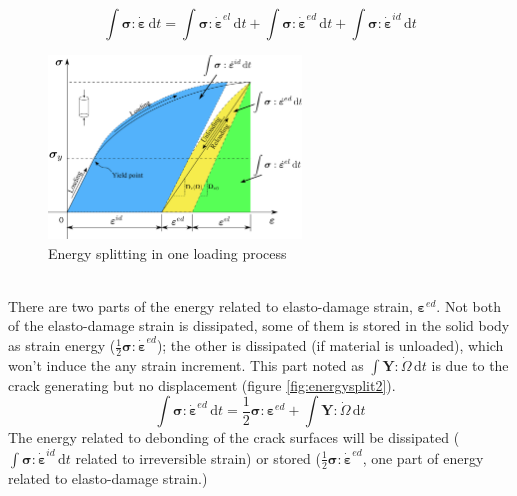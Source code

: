 \documentclass[preprint,review,12pt]{elsarticle}
\newcommand{\ud}{\textrm{d}}
\begin{document}
%
\begin{equation}
  \label{eq:econserv}
   \int\bm\sigma:\dot{\bm\varepsilon}\,\ud t = \int\bm\sigma:\dot{\bm\varepsilon}^{el}\,\ud t +
   \int\bm\sigma:\dot{\bm\varepsilon}^{ed}\,\ud t + \int\bm\sigma:\dot{\bm\varepsilon}^{id}\,\ud t
\end{equation}
%
\begin{figure}[htbp]
   \centering
   \includegraphics[width=0.6\textwidth]{inkscape/energy_split/energy_split.eps}
   \caption{Energy splitting in one loading process}
   \label{fig:energysplit1}
\end{figure}
\
\\
There are two parts of the energy related to elasto-damage strain, $\bm\varepsilon^{ed}$. Not both of the elasto-damage strain is dissipated, some of them is stored in the solid body as strain energy ($\frac{1}{2}\bm\sigma:\dot{\bm\varepsilon}^{ed}$); the other is dissipated (if material is unloaded), which won't induce the any strain increment. This part noted as $\int \bm{Y}:\dot{\bm\varOmega}\,\ud t$ is due to the crack generating but no displacement (figure \ref{fig:energysplit2}).
%
\begin{equation}\label{eq:esplit1}
   \int\bm\sigma:\dot{\bm\varepsilon}^{ed}\,\ud t = \frac{1}{2}\bm\sigma:\bm\varepsilon^{ed} +
   \int\bm{Y}:\dot{\bm\varOmega}\,\ud t
\end{equation}
%
The energy related to debonding of the crack surfaces will be dissipated ($\int \bm\sigma:\dot{\bm\varepsilon}^{id}\,\ud t$ related to irreversible strain) or stored ($\frac{1}{2}\bm\sigma:\dot{\bm\varepsilon}^{ed}$, one part of energy related to elasto-damage strain.)
\end{document}
